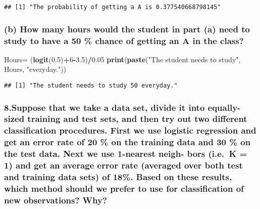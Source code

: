 \documentclass[]{article}
\newenvironment{Shaded}{\begin{snugshade}}{\end{snugshade}}
\newcommand{\KeywordTok}[1]{\textcolor[rgb]{0.13,0.29,0.53}{\textbf{#1}}}
\newcommand{\DecValTok}[1]{\textcolor[rgb]{0.00,0.00,0.81}{#1}}
\newcommand{\FloatTok}[1]{\textcolor[rgb]{0.00,0.00,0.81}{#1}}
\newcommand{\StringTok}[1]{\textcolor[rgb]{0.31,0.60,0.02}{#1}}
\newcommand{\OperatorTok}[1]{\textcolor[rgb]{0.81,0.36,0.00}{\textbf{#1}}}
\newcommand{\NormalTok}[1]{#1}
\begin{document}
\begin{verbatim}
## [1] "The probability of getting a A is 0.377540668798145"
\end{verbatim}

\subsubsection{(b) How many hours would the student in part (a) need to
study to have a 50 \% chance of getting an A in the
class?}\label{b-how-many-hours-would-the-student-in-part-a-need-to-study-to-have-a-50-chance-of-getting-an-a-in-the-class}

\begin{Shaded}
\begin{Highlighting}[]
\NormalTok{Hours=}\StringTok{ }\NormalTok{(}\KeywordTok{logit}\NormalTok{(}\FloatTok{0.5}\NormalTok{)}\OperatorTok{+}\DecValTok{6}\OperatorTok{-}\FloatTok{3.5}\NormalTok{)}\OperatorTok{/}\FloatTok{0.05}
\KeywordTok{print}\NormalTok{(}\KeywordTok{paste}\NormalTok{(}\StringTok{"The student needs to study"}\NormalTok{, Hours, }\StringTok{"everyday."}\NormalTok{))}
\end{Highlighting}
\end{Shaded}

\begin{verbatim}
## [1] "The student needs to study 50 everyday."
\end{verbatim}

\subsubsection{8.Suppose that we take a data set, divide it into
equally-sized training and test sets, and then try out two different
classification procedures. First we use logistic regression and get an
error rate of 20 \% on the training data and 30 \% on the test data.
Next we use 1-nearest neigh- bors (i.e.~K = 1) and get an average error
rate (averaged over both test and training data sets) of 18\%. Based on
these results, which method should we prefer to use for classification
of new observations?
Why?}\label{suppose-that-we-take-a-data-set-divide-it-into-equally-sized-training-and-test-sets-and-then-try-out-two-different-classification-procedures.-first-we-use-logistic-regression-and-get-an-error-rate-of-20-on-the-training-data-and-30-on-the-test-data.-next-we-use-1-nearest-neigh--bors-i.e.k-1-and-get-an-average-error-rate-averaged-over-both-test-and-training-data-sets-of-18.-based-on-these-results-which-method-should-we-prefer-to-use-for-classification-of-new-observations-why}
\end{document}
